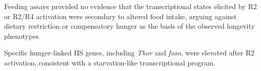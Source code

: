 Feeding assays provided no evidence that the transcriptional states elicited by R2 or R2/R4 activation were secondary to altered food intake, arguing against dietary restriction or compensatory hunger as the basis of the observed longevity phenotypes. 

Specific hunger-linked IIS genes, including \textit{Thor} and \textit{foxo}, were elevated after R2 activation, consistent with a starvation-like transcriptional program. 


